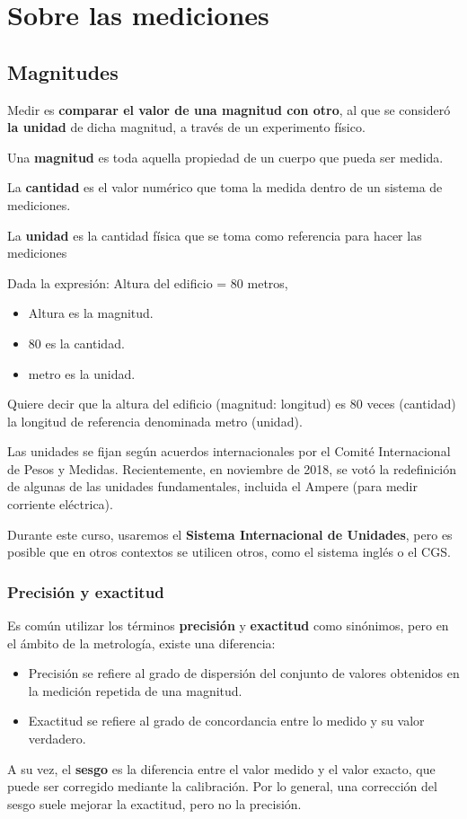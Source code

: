 
\chapter{Sobre las mediciones}
\section{Magnitudes}
Medir es \textbf{comparar el valor de una magnitud con otro}, al que se consideró \textbf{la unidad} de dicha magnitud, a través de un experimento físico.

Una \textbf{magnitud} es toda aquella propiedad de un cuerpo que pueda ser medida.

La \textbf{cantidad} es el valor numérico que toma la medida dentro de un sistema de mediciones.

La \textbf{unidad} es la cantidad física que se toma como referencia para hacer las mediciones

\begin{ejemplo}
	Dada la expresión: Altura del edificio = 80 metros,
	\begin{itemize}
		\item Altura es la magnitud.
		\item 80 es la cantidad.
		\item metro es la unidad.
	\end{itemize}
	
	Quiere decir que la altura del edificio (magnitud: longitud) es 80 veces (cantidad) la longitud de referencia denominada metro (unidad).
\end{ejemplo}

Las unidades se fijan según acuerdos internacionales por el Comité Internacional de Pesos y Medidas. Recientemente, en noviembre de 2018, se votó la redefinición de algunas de las unidades fundamentales, incluida el Ampere (para medir corriente eléctrica).

Durante este curso, usaremos el \textbf{Sistema Internacional de Unidades}, pero es posible que en otros contextos se utilicen otros, como el sistema inglés o el CGS.
\subsection{Precisión y exactitud}
	Es común utilizar los términos \textbf{precisión} y \textbf{exactitud} como sinónimos, pero en el ámbito de la metrología, existe una diferencia:
	\begin{itemize}
		\item Precisión se refiere al grado de dispersión del conjunto de valores obtenidos en la medición repetida de una magnitud.
		\item Exactitud se refiere al grado de concordancia entre lo medido y su valor verdadero.
	\end{itemize}
	A su vez, el \textbf{sesgo} es la diferencia entre el valor medido y el valor exacto, que puede ser corregido mediante la calibración. Por lo general, una corrección del sesgo suele mejorar la exactitud, pero no la precisión.
